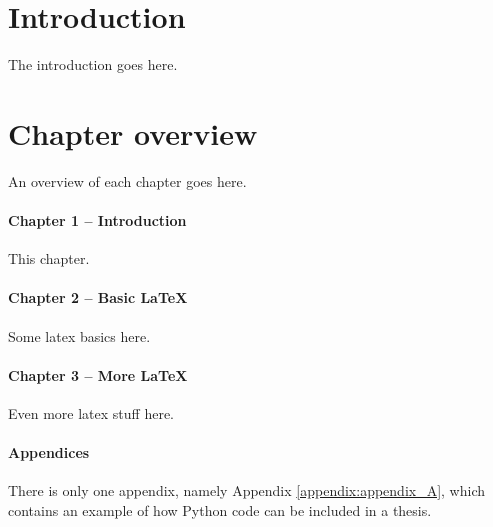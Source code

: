 \section{Introduction}
The introduction goes here.

\section{Chapter overview}

An overview of each chapter goes here.

\paragraph{Chapter 1 -- Introduction}
This chapter.

\paragraph{Chapter 2 -- Basic \LaTeX{}}
Some latex basics here.

\paragraph{Chapter 3 -- More \LaTeX{}}
Even more latex stuff here.

\paragraph{Appendices}
There is only one appendix, namely Appendix \ref{appendix:appendix_A}, which contains an example of how Python code can be included in a thesis.